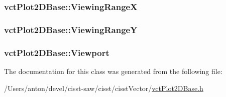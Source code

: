 \subsubsection[{Viewing\+Range\+X}]{ vct\+Plot2\+D\+Base\+::\+Viewing\+Range\+X\hspace{0.3cm}{\ttfamily [protected]}}\label{classvct_plot2_d_base_aac54c32c843faaba49bfa0424ac4009f}
\hypertarget{classvct_plot2_d_base_a61aef57ba3009eef0104325f64c8524f}{}
\subsubsection[{Viewing\+Range\+Y}]{ vct\+Plot2\+D\+Base\+::\+Viewing\+Range\+Y\hspace{0.3cm}{\ttfamily [protected]}}\label{classvct_plot2_d_base_a61aef57ba3009eef0104325f64c8524f}
\hypertarget{classvct_plot2_d_base_a35e351a70eb6b942f80d354a74a9eb8b}{}
\subsubsection[{Viewport}]{ vct\+Plot2\+D\+Base\+::\+Viewport\hspace{0.3cm}{\ttfamily [protected]}}\label{classvct_plot2_d_base_a35e351a70eb6b942f80d354a74a9eb8b}


The documentation for this class was generated from the following file\+:\begin{DoxyCompactItemize}
\item 
/\+Users/anton/devel/cisst-\/saw/cisst/cisst\+Vector/\hyperlink{vct_plot2_d_base_8h}{vct\+Plot2\+D\+Base.\+h}\end{DoxyCompactItemize}
